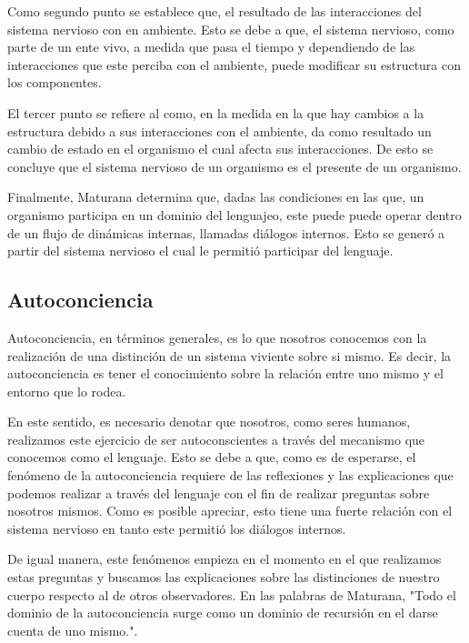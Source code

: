 \documentclass[10pt]{article}
\begin{document}
        Como segundo punto se establece que, el resultado de las interacciones del sistema nervioso con en ambiente. Esto se debe a que, el sistema nervioso, como parte de un ente vivo, a medida que pasa el tiempo y dependiendo de las interacciones que este perciba con el ambiente, puede modificar su estructura con los componentes.

        El tercer punto se refiere al como, en la medida en la que hay cambios a la estructura debido a sus interacciones con el ambiente, da como resultado un cambio de estado en el organismo el cual afecta sus interacciones. De esto se concluye que el sistema nervioso de un organismo es el presente de un organismo.

        Finalmente, Maturana determina que, dadas las condiciones en las que, un organismo participa en un dominio del lenguajeo, este puede puede operar dentro de un flujo de dinámicas internas, llamadas diálogos internos. Esto se generó a partir del sistema nervioso el cual le permitió participar del lenguaje. 

        \subsection{Autoconciencia}

        Autoconciencia, en términos generales, es lo que nosotros conocemos con la realización de una distinción de un sistema viviente sobre si mismo. Es decir, la autoconciencia es tener el conocimiento sobre la relación entre uno mismo y el entorno que lo rodea. 

        En este sentido, es necesario denotar que nosotros, como seres humanos, realizamos este ejercicio de ser autoconscientes a través del mecanismo que conocemos como el lenguaje. Esto se debe a que, como es de esperarse, el fenómeno de la autoconciencia requiere de las reflexiones y las explicaciones que podemos realizar a través del lenguaje con el fin de realizar preguntas sobre nosotros mismos. Como es posible apreciar, esto tiene una fuerte relación con el sistema nervioso en tanto este permitió los diálogos internos.
        
        De igual manera, este fenómenos empieza en el momento en el que realizamos estas preguntas y buscamos las explicaciones sobre las distinciones de nuestro cuerpo respecto al de otros observadores. En las palabras de Maturana, "Todo el dominio de la autoconciencia surge como un dominio de recursión en el darse cuenta de uno mismo.".
\end{document}
